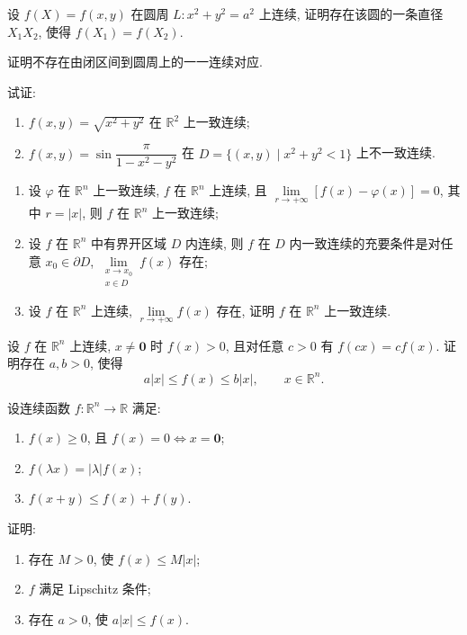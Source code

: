 \documentclass[../../数学分析培优讲义.tex]{subfiles}
\begin{document}
\begin{example}
设 $f(X)=f(x,y)$ 在圆周 $L:x^2+y^2=a^2$ 上连续, 证明存在该圆的一条直径 $X_1X_2$, 使得 $f(X_1)=f(X_2)$.
\end{example}
\exampleblank

\begin{example}
证明不存在由闭区间到圆周上的一一连续对应.
\end{example}
\exampleblank

\begin{example}
试证:
\begin{enumerate}[label=(\arabic*)]
    \item $f(x,y)=\sqrt{x^2+y^2}$ 在 $\mathbb{R}^2$ 上一致连续;
    \item $\displaystyle f(x,y)=\sin\dfrac{\pi}{1-x^2-y^2}$ 在 $D=\{(x,y)\mid x^2+y^2<1\}$ 上不一致连续.
\end{enumerate}
\end{example}
\exampleblank

\begin{example}
\begin{enumerate}[label=(\arabic*)]
    \item 设 $\varphi$ 在 $\mathbb{R}^n$ 上一致连续, $f$ 在 $\mathbb{R}^n$ 上连续, 且 $\displaystyle\lim\limits_{r\to+\infty}[f(x)-\varphi(x)]=0$, 其中 $r=|x|$, 则 $f$ 在 $\mathbb{R}^n$ 上一致连续;
    \item 设 $f$ 在 $\mathbb{R}^n$ 中有界开区域 $D$ 内连续, 则 $f$ 在 $D$ 内一致连续的充要条件是对任意 $x_0\in\partial D$, $\displaystyle\lim\limits_{\substack{x\to x_0\\x\in D}}f(x)$ 存在;
    \item 设 $f$ 在 $\mathbb{R}^n$ 上连续, $\displaystyle\lim\limits_{r\to+\infty}f(x)$ 存在, 证明 $f$ 在 $\mathbb{R}^n$ 上一致连续.
\end{enumerate}
\end{example}
\exampleblank

\begin{example}[\markstar]
设 $f$ 在 $\mathbb{R}^n$ 上连续, $x\ne\bm{0}$ 时 $f(x)>0$, 且对任意 $c>0$ 有 $f(cx)=cf(x)$. 证明存在 $a,b>0$, 使得
\[
    a|x|\leq f(x)\leq b|x|,
    \qquad x\in\mathbb{R}^n.
\]
\end{example}
\exampleblank

\begin{example}[\markstar]
设连续函数 $f:\mathbb{R}^n\to\mathbb{R}$ 满足:
\begin{enumerate}[label=(\roman*)]
    \item $f(x)\geq0$, 且 $f(x)=0\iff x=\bm{0}$;
    \item $f(\lambda x)=|\lambda|f(x)$;
    \item $f(x+y)\leq f(x)+f(y)$.
\end{enumerate}
证明:
\begin{enumerate}[label=(\arabic*)]
    \item 存在 $M>0$, 使 $f(x)\leq M|x|$;
    \item $f$ 满足 Lipschitz 条件;
    \item 存在 $a>0$, 使 $a|x|\leq f(x)$.
\end{enumerate}
\end{example}
\exampleblank
\end{document}
